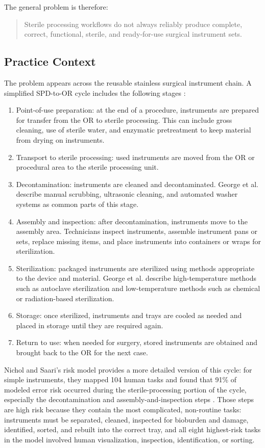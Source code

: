 \documentclass[10pt,a4paper]{article}
\begin{document}
The general problem is therefore:
\begin{quote}
Sterile processing workflows do not always reliably produce complete,
correct, functional, sterile, and ready-for-use surgical instrument sets.
\end{quote}
\subsection{Practice Context}
\label{sec:practice-context}

The problem appears across the reusable stainless surgical instrument chain. A simplified
SPD-to-OR cycle includes the following stages
\cite{george-et-al-2024}:
\begin{enumerate}
  \item Point-of-use preparation: at the end of a procedure, instruments are prepared for transfer from the OR to sterile processing. This can include gross cleaning, use of sterile water, and enzymatic pretreatment to keep material from drying on instruments.
  \item Transport to sterile processing: used instruments are moved from the OR or procedural area to the sterile processing unit.
  \item Decontamination: instruments are cleaned and decontaminated. George et al. describe manual scrubbing, ultrasonic cleaning, and automated washer systems as common parts of this stage.
  \item Assembly and inspection: after decontamination, instruments move to the assembly area. Technicians inspect instruments, assemble instrument pans or sets, replace missing items, and place instruments into containers or wraps for sterilization.
  \item Sterilization: packaged instruments are sterilized using methods appropriate to the device and material. George et al. describe high-temperature methods such as autoclave sterilization and low-temperature methods such as chemical or radiation-based sterilization.
  \item Storage: once sterilized, instruments and trays are cooled as needed and placed in storage until they are required again.
  \item Return to use: when needed for surgery, stored instruments are obtained and brought back to the OR for the next case.
\end{enumerate}
Nichol and Saari's risk model provides a more detailed version of this cycle:
for simple instruments, they mapped 104 human tasks and found that 91\% of
modeled error risk occurred during the sterile-processing portion of the cycle,
especially the decontamination and assembly-and-inspection steps
\cite{nichol-and-saari-risk-modeling-2023}.
Those steps are high risk because they contain the most complicated,
non-routine tasks: instruments must be separated, cleaned, inspected for
bioburden and damage, identified, sorted, and rebuilt into the correct tray, and
all eight highest-risk tasks in the model involved human visualization,
inspection, identification, or sorting.
\end{document}
